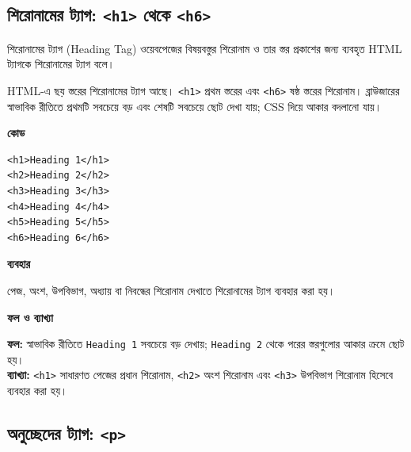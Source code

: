 \subsection{শিরোনামের ট্যাগ: \texttt{<h1>} থেকে \texttt{<h6>}}

\begin{definitionbox}{শিরোনামের ট্যাগ (Heading Tag)}
ওয়েবপেজের বিষয়বস্তুর শিরোনাম ও তার স্তর প্রকাশের জন্য ব্যবহৃত HTML ট্যাগকে শিরোনামের ট্যাগ বলে।
\end{definitionbox}

HTML-এ ছয় স্তরের শিরোনামের ট্যাগ আছে। \texttt{<h1>} প্রথম স্তরের এবং \texttt{<h6>} ষষ্ঠ স্তরের শিরোনাম। ব্রাউজারের স্বাভাবিক রীতিতে প্রথমটি সবচেয়ে বড় এবং শেষটি সবচেয়ে ছোট দেখা যায়; CSS দিয়ে আকার বদলানো যায়।

\par\noindent
\begin{minipage}[t]{.50\linewidth}\vspace{0pt}\small
\textbf{\color{chFourTeal}কোড}\par
\begin{verbatim}
<h1>Heading 1</h1>
<h2>Heading 2</h2>
<h3>Heading 3</h3>
<h4>Heading 4</h4>
<h5>Heading 5</h5>
<h6>Heading 6</h6>
\end{verbatim}

\par\smallskip
\end{minipage}\hfill
\begin{minipage}[t]{.46\linewidth}\vspace{0pt}\small
\textbf{\color{chFourTeal}ব্যবহার}\par
পেজ, অংশ, উপবিভাগ, অধ্যায় বা নিবন্ধের শিরোনাম দেখাতে শিরোনামের ট্যাগ ব্যবহার করা হয়।
\par\smallskip

\textbf{\color{chFourTeal}ফল ও ব্যাখ্যা}\par
\textbf{ফল:} স্বাভাবিক রীতিতে \texttt{Heading 1} সবচেয়ে বড় দেখায়; \texttt{Heading 2} থেকে পরের স্তরগুলোর আকার ক্রমে ছোট হয়।\\
\textbf{ব্যাখ্যা:} \texttt{<h1>} সাধারণত পেজের প্রধান শিরোনাম, \texttt{<h2>} অংশ শিরোনাম এবং \texttt{<h3>} উপবিভাগ শিরোনাম হিসেবে ব্যবহার করা হয়।
\par\smallskip
\end{minipage}\par


\subsection{অনুচ্ছেদের ট্যাগ: \texttt{<p>}}

